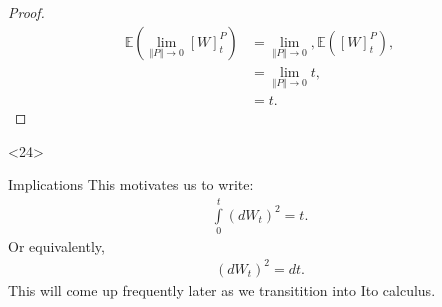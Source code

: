 \documentclass[10pt]{beamer}
\begin{document}
\begin{frame}[t]
\begin{onlyenv}
\begin{proof}
        \begin{align*}
          \mathbb{E}\left( \lim\limits_{\Vert P \Vert \to 0} \left[ W \right]^{P}_{t} \right) &= \lim\limits_{\Vert P \Vert \to 0},
          \mathbb{E}\left(\left[ W \right]^{P}_{t} \right), \\
          &= \lim\limits_{\Vert P \Vert \to 0} t, \\
          &= t.
        \end{align*}
      \end{proof}
    \end{onlyenv}
    \begin{onlyenv}<24>
      \begin{block}{Implications}
        This motivates us to write:
        \begin{align*}
          \int\limits_{0}^{t}(dW_t)^2 = t.
        \end{align*}
        Or equivalently,
        \begin{align*}
          (dW_t)^2 = dt.
        \end{align*}
        This will come up frequently later as we transitition into Ito calculus.
      \end{block}
  \end{onlyenv}
\end{frame}
\end{document}
